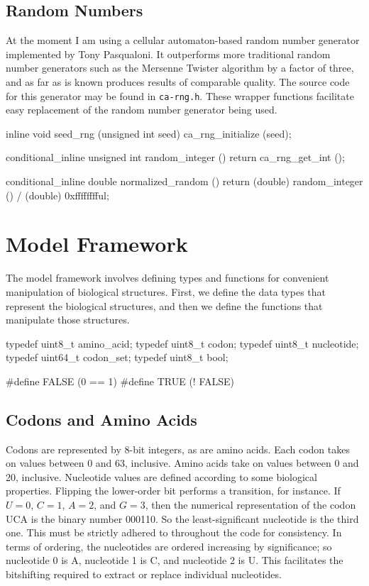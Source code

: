 \documentclass{article}
\begin{document}
    \subsection{Random Numbers}
      \label{sec:random}

      At the moment I am using a cellular automaton-based random number
      generator implemented by Tony Pasqualoni. It outperforms more traditional
      random number generators such as the Mersenne Twister algorithm by a
      factor of three, and as far as is known produces results of comparable
      quality. The source code for this generator may be found in
      \verb|ca-rng.h|. These wrapper functions facilitate easy replacement of
      the random number generator being used.

\begin{ccode}
inline void seed_rng (unsigned int seed)
  {ca_rng_initialize (seed);}

conditional_inline unsigned int random_integer ()
  {return ca_rng_get_int ();}

conditional_inline double normalized_random ()
  {return (double) random_integer () / (double) 0xfffffffful;}
\end{ccode}

  \section{Model Framework}
    \label{sec:framework}

    The model framework involves defining types and functions for convenient
    manipulation of biological structures. First, we define the data types that
    represent the biological structures, and then we define the functions that
    manipulate those structures.

\begin{ccode}
typedef uint8_t		amino_acid;
typedef uint8_t		codon;
typedef uint8_t		nucleotide;
typedef uint64_t	codon_set;
typedef uint8_t		bool;

#define FALSE (0 == 1)
#define TRUE (! FALSE)
\end{ccode}

    \subsection{Codons and Amino Acids}
      \label{sec:codons-amino-acids}

      Codons are represented by 8-bit integers, as are amino acids. Each codon
      takes on values between 0 and 63, inclusive. Amino acids take on values
      between 0 and 20, inclusive. Nucleotide values are defined according to
      some biological properties. Flipping the lower-order bit performs a
      transition, for instance. If $U = 0$, $C = 1$, $A = 2$, and $G = 3$, then
      the numerical representation of the codon UCA is the binary number 000110.
      So the least-significant nucleotide is the third one. This must be
      strictly adhered to throughout the code for consistency. In terms of
      ordering, the nucleotides are ordered increasing by significance; so
      nucleotide 0 is A, nucleotide 1 is C, and nucleotide 2 is U. This
      facilitates the bitshifting required to extract or replace individual
      nucleotides.
      
\end{document}
